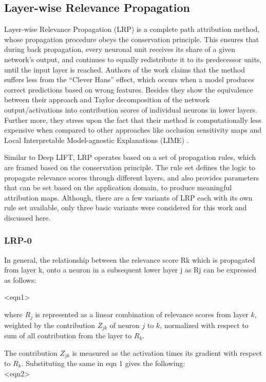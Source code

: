 \documentclass[../report.tex]{subfiles}
\begin{document}
\subsection{Layer-wise Relevance Propagation}

Layer-wise Relevance Propagation (LRP) \cite{lrp} is a complete path attribution method, whose propagation procedure obeys the conservation principle. This ensures that during back propagation, every neuronal unit receives its share of a given network’s output, and continues to equally redistribute it to its predecessor units, until the input layer is reached. Authors of the work claims that the method suffers less from the \enquote{Clever Hans} effect, which occurs when a model produces correct predictions based on wrong features. Besides they show the equivalence between their approach and Taylor decomposition of the network output/activations into contribution scores of individual neurons in lower layers. Further more, they stress upon the fact that their method is computationally less expensive when compared to other approaches like occlusion sensitivity maps and Local Interpretable Model-agnostic Explanations (LIME) \cite{lime}.

Similar to Deep LIFT, LRP operates based on a set of propagation rules, which are framed based on the conservation principle. The rule set defines the logic to propagate relevance scores through different layers, and also provides parameters that can be set based on the application domain, to produce meaningful attribution maps. Although, there are a few variants of LRP each with its own rule set available, only three basic variants were considered for this work and discussed here.

\subsubsection{LRP-0}
In general,  the relationship between the relevance score Rk which is propagated from layer k, onto a neuron in a subsequent lower layer j as Rj can be expressed as follows:

<eqn1>

where $R_j$ is represented as a linear combination of relevance scores from layer $k$, weighted by the  contribution $Z_{jk}$ of neuron $j$ to $k$, normalized with respect to sum of all contribution from the layer to $R_k$.

The contribution $Z_{jk}$ is measured as the activation times its gradient with respect to $R_k$. Substituting the same in eqn 1 gives the following:\\
<eqn2>
\end{document}
